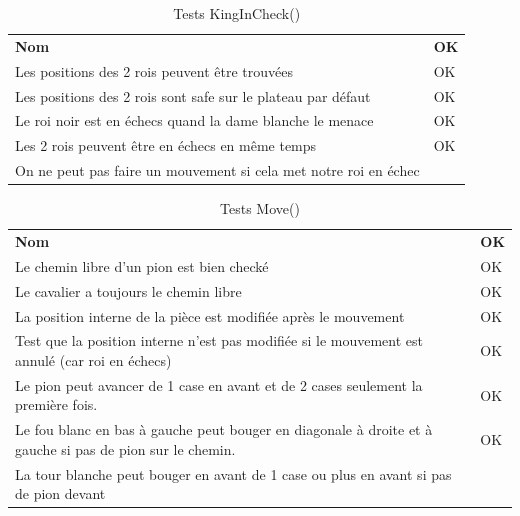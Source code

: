 \documentclass[12pt]{article}
\begin{document}
\begin{table}[h!]
\caption{Tests KingInCheck()}
\begin{tabular}{ll}
\textbf{Nom}                                                     & \textbf{OK }\\
Les positions des 2 rois peuvent être trouvées                   & OK \\
Les positions des 2 rois sont safe sur le plateau par défaut     & OK \\
Le roi noir est en échecs quand la dame blanche le menace        & OK \\
Les 2 rois peuvent être en échecs en même temps                  & OK \\
On ne peut pas faire un mouvement si cela met notre roi en échec &
\end{tabular}
\end{table}

\begin{table}[h!]
\caption{Tests Move()}
\begin{tabular}{ll}
\textbf{Nom}                                                                                             & \textbf{OK }\\
Le chemin libre d'un pion est bien checké                                                                & OK \\
Le cavalier a toujours le chemin libre                                                                   & OK \\
La position interne de la pièce est modifiée après le mouvement                                          & OK \\
Test que la position interne n'est pas modifiée si le mouvement est annulé (car roi en échecs)           & OK \\
Le pion peut avancer de 1 case en avant et de 2 cases seulement la première fois.                        & OK \\
Le fou blanc en bas à gauche peut bouger en diagonale à droite et à gauche si pas de pion sur le chemin. & OK \\
La tour blanche peut bouger en avant de 1 case ou plus en avant si pas de pion devant                    &
\end{tabular}
\end{table}
\end{document}
